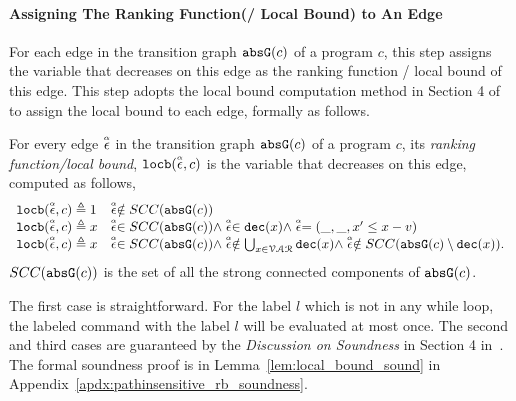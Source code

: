 \paragraph*{Assigning The Ranking Function(/ Local Bound) to An Edge}
For each edge in the transition graph $\mathtt{abs}{\mathtt{G}}(c)$ of a program $c$,
this step assigns the variable that decreases on this edge as the ranking function / local bound of this edge.
This step adopts the local bound computation method in Section 4 of \cite{sinn2017complexity} to assign the local bound to each edge,
formally as follows.
\begin{defn}
  \label{def:ranking_gen}
For every edge $\stackrel{\scriptscriptstyle{\alpha}}{\mathtt{\epsilon}{}}$ in the transition graph $\mathtt{abs}{\mathtt{G}}(c)$ of a program $c$,
its \emph{ranking function/local bound}, $\mathtt{locb}(\stackrel{\scriptscriptstyle{\alpha}}{\mathtt{\epsilon}{}}, c)$
is the variable that decreases on this edge, computed as follows,
%
\[ 
\begin{array}{ll}
  \mathtt{locb}(\stackrel{\scriptscriptstyle{\alpha}}{\mathtt{\epsilon}{}}, c) \triangleq 1 
  & \stackrel{\scriptscriptstyle{\alpha}}{\mathtt{\epsilon}{}} \notin SCC(\mathtt{abs}{\mathtt{G}}(c))
  \\
  \mathtt{locb}(\stackrel{\scriptscriptstyle{\alpha}}{\mathtt{\epsilon}{}}, c) \triangleq x
  & \stackrel{\scriptscriptstyle{\alpha}}{\mathtt{\epsilon}{}} \in SCC(\mathtt{abs}{\mathtt{G}}(c)) \land \stackrel{\scriptscriptstyle{\alpha}}{\mathtt{\epsilon}{}} \in \mathtt{dec}(x) \land  \stackrel{\scriptscriptstyle{\alpha}}{\mathtt{\epsilon}{}} = (\_, \_ , x' \leq x - v) \\
  \mathtt{locb}(\stackrel{\scriptscriptstyle{\alpha}}{\mathtt{\epsilon}{}}, c) \triangleq x
  & \stackrel{\scriptscriptstyle{\alpha}}{\mathtt{\epsilon}{}} \in SCC(\mathtt{abs}{\mathtt{G}}(c)) \land 
  \stackrel{\scriptscriptstyle{\alpha}}{\mathtt{\epsilon}{}}  \notin \bigcup_{x \in \mathcal{VAR}} \mathtt{dec}(x)
  \land \stackrel{\scriptscriptstyle{\alpha}}{\mathtt{\epsilon}{}} \notin SCC(\mathtt{abs}{\mathtt{G}}(c) \setminus \mathtt{dec}(x)).
\end{array}
\]
$SCC(\mathtt{abs}{\mathtt{G}}(c))$ is the set of all the strong connected components of $\mathtt{abs}{\mathtt{G}}(c)$.
\end{defn}
  The first case is straightforward. 
  For the label $l$ which is not in any while loop, 
  the labeled command with the label $l$ will be 
  evaluated at most once. 
  The second and third cases are guaranteed by the \emph{Discussion on Soundness} in Section 4 in~\cite{sinn2017complexity}.
  The formal soundness proof is in Lemma~\ref{lem:local_bound_sound} in Appendix~\ref{apdx:pathinsensitive_rb_soundness}.
%
